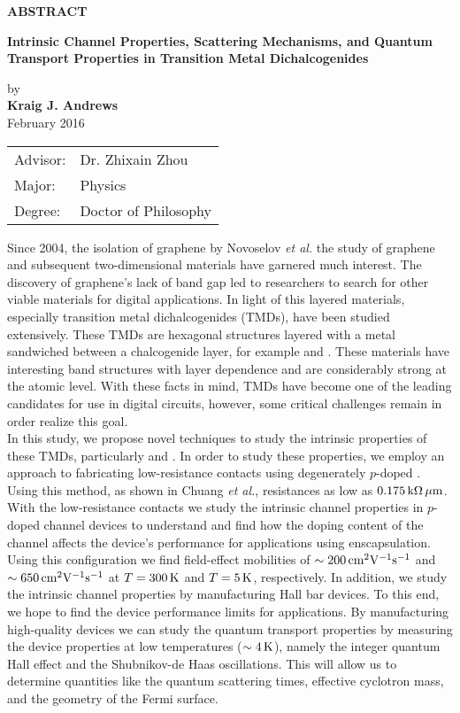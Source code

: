 \begin{center}
\textbf{ABSTRACT}
	
	
	\singlespacing
\textbf{Intrinsic Channel Properties, Scattering Mechanisms, and Quantum Transport Properties in Transition Metal Dichalcogenides}\\
	\doublespacing
	
	by\\
	
	\textbf{Kraig J. Andrews}\\
	February 2016\\
\end{center}
\begin{tabular}{ll}	
Advisor: &Dr. Zhixain Zhou\\
Major:   &Physics\\
Degree:  &Doctor of Philosophy
\end{tabular}
\bigskip

\noindent Since 2004, the isolation of graphene by Novoselov \emph{et al.} the study of graphene and subsequent two-dimensional materials have garnered much interest. The discovery of graphene's lack of band gap led to researchers to search for other viable materials for digital applications. In light of this layered materials, especially transition metal dichalcogenides (TMDs), have been studied extensively. These TMDs are hexagonal structures layered with a metal sandwiched between a chalcogenide layer, for example  and . These materials have interesting band structures with layer dependence and are considerably strong at the atomic level. With these facts in mind, TMDs have become one of the leading candidates for use in digital circuits, however, some critical challenges remain in order realize this goal.\\ 

\noindent In this study, we propose novel techniques to study the intrinsic properties of these TMDs, particularly  and . In order to study these properties, we employ an approach to fabricating low-resistance contacts using degenerately $p$-doped . Using this method, as shown in Chuang \emph{et al.}, resistances as low as $0.175\,\mathrm{k\Omega}\,\mathrm{\mu m}$. With the low-resistance contacts we study the intrinsic channel properties in $p$-doped  channel devices to understand and find how the doping content of the channel affects the device's performance for applications using \hbn enscapsulation. Using this configuration we find field-effect mobilities of $\sim 200\,\mathrm{cm}^{2}\mathrm{V}^{-1}\mathrm{s}^{-1}$ and $\sim 650\,\mathrm{cm}^{2}\mathrm{V}^{-1}\mathrm{s}^{-1}$ at $T=300\,\mathrm{K}$ and $T=5\,\mathrm{K}$, respectively. In addition, we study the intrinsic channel properties by manufacturing Hall bar devices. To this end, we hope to find the device performance limits for applications. By manufacturing high-quality devices we can study the quantum transport properties by measuring the device properties at low temperatures ($\sim 4\,\mathrm{K}$), namely the integer quantum Hall effect and the Shubnikov-de Haas oscillations. This will allow us to determine quantities like the quantum scattering times, effective cyclotron mass, and the geometry of the Fermi surface. 